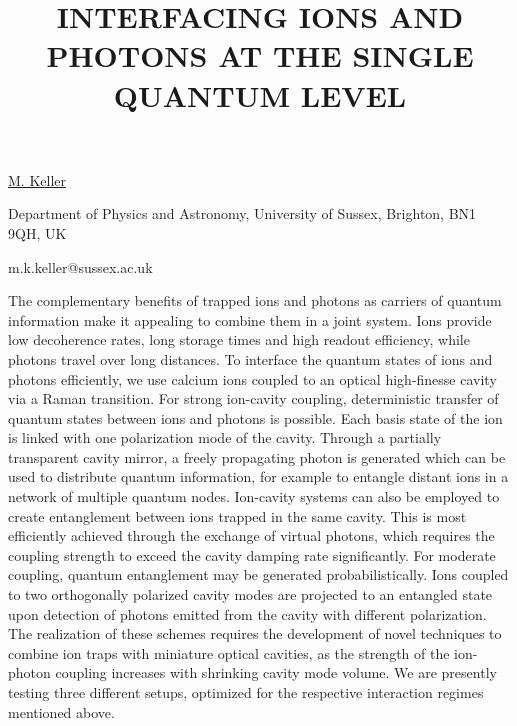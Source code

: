 \title{INTERFACING IONS AND PHOTONS AT THE SINGLE QUANTUM LEVEL}

\underline{M. Keller}

{\normalsize{\vspace{-4mm}
Department of Physics and Astronomy,
University of Sussex,
Brighton, BN1 9QH, UK

\email m.k.keller@sussex.ac.uk}}

The complementary benefits of trapped ions and photons as carriers of quantum information make it appealing to combine them in a joint system. Ions provide low decoherence rates, long storage times and high readout efficiency, while photons travel over long distances. To interface the quantum states of ions and photons efficiently, we use calcium ions coupled to an optical high-finesse cavity via a Raman transition.
For strong ion-cavity coupling, deterministic transfer of quantum states between ions and photons is possible. Each basis state of the ion is linked with one polarization mode of the cavity. Through a partially transparent cavity mirror, a freely propagating photon is generated which can be used to distribute quantum information, for example to entangle distant ions in a network of multiple quantum nodes. Ion-cavity systems can also be employed to create entanglement between ions trapped in the same cavity. This is most efficiently achieved through the exchange of virtual photons, which requires the coupling strength to exceed the cavity damping rate significantly. For moderate coupling, quantum entanglement may be generated probabilistically. Ions coupled to two orthogonally polarized cavity modes are projected to an entangled state upon detection of photons emitted from the cavity with different polarization.
The realization of these schemes requires the development of novel techniques to combine ion traps with miniature optical cavities, as the strength of the ion-photon coupling increases with shrinking cavity mode volume. We are presently testing three different setups, optimized for the respective interaction regimes mentioned above.

\vspace{\baselineskip} 